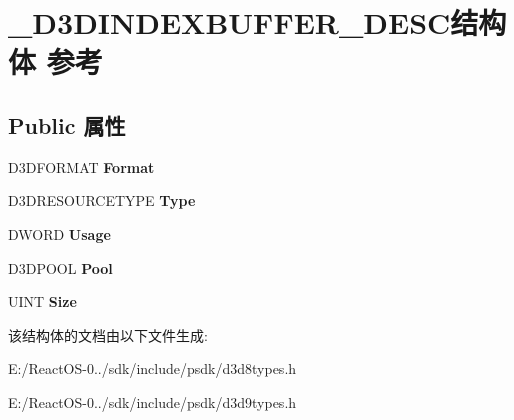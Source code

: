 \hypertarget{struct___d3_d_i_n_d_e_x_b_u_f_f_e_r___d_e_s_c}{}\section{\+\_\+\+D3\+D\+I\+N\+D\+E\+X\+B\+U\+F\+F\+E\+R\+\_\+\+D\+E\+S\+C结构体 参考}
\label{struct___d3_d_i_n_d_e_x_b_u_f_f_e_r___d_e_s_c}
\subsection*{Public 属性}
\begin{DoxyCompactItemize}
\item 
\mbox{\label{struct___d3_d_i_n_d_e_x_b_u_f_f_e_r___d_e_s_c_a33541fd9473d01bce8df3d7f4bd161fc}} 
D3\+D\+F\+O\+R\+M\+AT {\bfseries Format}
\item 
\mbox{\label{struct___d3_d_i_n_d_e_x_b_u_f_f_e_r___d_e_s_c_a7bc03107f30a29195ce2bddaf0f2a26e}} 
D3\+D\+R\+E\+S\+O\+U\+R\+C\+E\+T\+Y\+PE {\bfseries Type}
\item 
\mbox{\label{struct___d3_d_i_n_d_e_x_b_u_f_f_e_r___d_e_s_c_a5b9465043c14bd480c038a5dfd154f71}} 
D\+W\+O\+RD {\bfseries Usage}
\item 
\mbox{\label{struct___d3_d_i_n_d_e_x_b_u_f_f_e_r___d_e_s_c_ad56d3bfd72602fb59c21435e174d48a3}} 
D3\+D\+P\+O\+OL {\bfseries Pool}
\item 
\mbox{\label{struct___d3_d_i_n_d_e_x_b_u_f_f_e_r___d_e_s_c_a5d7053ee387cbd31b99b8790bc08a861}} 
U\+I\+NT {\bfseries Size}
\end{DoxyCompactItemize}


该结构体的文档由以下文件生成\+:\begin{DoxyCompactItemize}
\item 
E\+:/\+React\+O\+S-\/0../sdk/include/psdk/d3d8types.\+h\item 
E\+:/\+React\+O\+S-\/0../sdk/include/psdk/d3d9types.\+h\end{DoxyCompactItemize}
